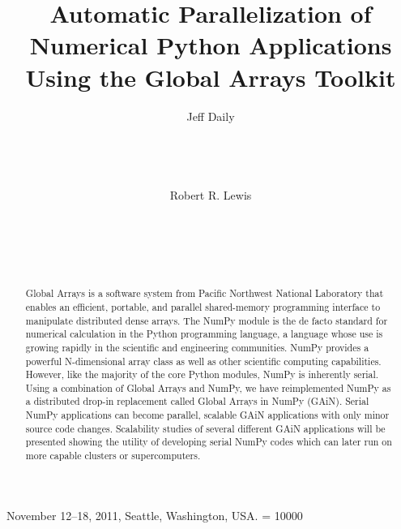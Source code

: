 \documentclass{sig-alt-release2}
\begin{document}
 {November 12--18, 2011, Seattle, Washington, USA.} 
\widowpenalty = 10000

\title{Automatic Parallelization of Numerical Python Applications Using the Global Arrays Toolkit}

\author{
\alignauthor
Jeff Daily\\
\\
\\
\\
\\
\alignauthor
Robert R. Lewis\\
\\
\\
\\
\\
}

\maketitle
\begin{abstract}
Global Arrays is a software system from Pacific Northwest National Laboratory
that enables an efficient, portable, and parallel shared-memory programming
interface to manipulate distributed dense arrays. The NumPy module is the de
facto standard for numerical calculation in the Python programming language, a
language whose use is growing rapidly in the scientific and engineering
communities. NumPy provides a powerful N-dimensional array class as well as
other scientific computing capabilities. However, like the majority of the core
Python modules, NumPy is inherently serial. Using a combination of Global
Arrays and NumPy, we have reimplemented NumPy as a distributed drop-in
replacement called Global Arrays in NumPy (GAiN). Serial NumPy applications can
become parallel, scalable GAiN applications with only minor source code
changes.  Scalability studies of several different GAiN applications will be
presented showing the utility of developing serial NumPy codes which can later
run on more capable clusters or supercomputers.
\end{abstract}
\end{document}
